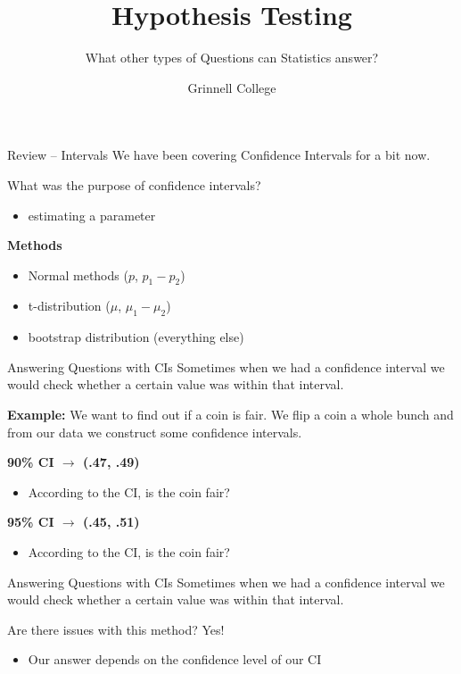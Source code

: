 \documentclass{beamer}
\title[Introduction to Statistics]{Hypothesis Testing}
\subtitle{What other types of Questions can Statistics answer?}
\author{Grinnell College}
\date{}
\begin{document}
\begin{frame}
  \titlepage
\end{frame}

\begin{frame}{Review -- Intervals}
We have been covering Confidence Intervals for a bit now. \vspace{8mm}

What was the purpose of confidence intervals?
\begin{itemize}
    \item estimating a parameter
\end{itemize} \vspace{8mm}

\textbf{Methods}
\begin{itemize}
    \item Normal methods ($p$, $p_1 - p_2$)
    \item t-distribution ($\mu$, $\mu_1-\mu_2$)
    \item bootstrap distribution (everything else)
\end{itemize}
\end{frame}

\begin{frame}{Answering Questions with CIs}
Sometimes when we had a confidence interval we would check whether a certain value was within that interval. \vspace{12mm}

\textbf{Example:} We want to find out if a coin is fair. We flip a coin a whole bunch and from our data we construct some confidence intervals. \vspace{4mm}

\textbf{90\% CI $\rightarrow$ (.47, .49)}
\begin{itemize}
    \item According to the CI, is the coin fair?
\end{itemize} \vspace{6mm}

\textbf{95\% CI $\rightarrow$ (.45, .51)}
\begin{itemize}
    \item According to the CI, is the coin fair?
\end{itemize}
\end{frame}

\begin{frame}{Answering Questions with CIs}
Sometimes when we had a confidence interval we would check whether a certain value was within that interval. \vspace{12mm}

Are there issues with this method? Yes!
\begin{itemize}
    \item Our answer depends on the confidence level of our CI
\end{itemize}
\end{frame}
\end{document}
